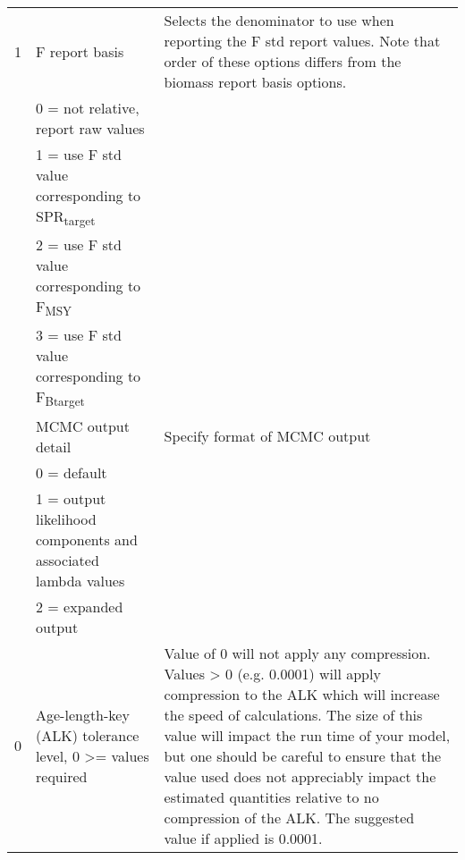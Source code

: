 \begin{landscape}
\begin{longtable}{p{1.5cm} p{7cm} p{12.5cm}}
 \hline
 1 & F report basis &  \multirow{1}{1cm}[-0.1cm]{\parbox{11cm}{Selects the denominator to use when reporting the F std report values.  Note that order of these options differs from the biomass report basis options.}}\\
   & 0 = not relative, report raw values & \\
   & 1 = use F std value corresponding to SPR\textsubscript{target} & \\
   & 2 = use F std value corresponding to F\textsubscript{MSY} & \\
   & 3 = use F std value corresponding to F\textsubscript{Btarget} & \\

  \pagebreak
  0 & MCMC output detail & \multirow{1}{1cm}[-0.1cm]{\parbox{11cm}{Specify format of MCMC output}} \\
  & 0 = default & \\
  & 1 = output likelihood components and associated lambda values &  \\
  & 2 = expanded output &  \\		 
  
  \hline
  \hypertarget{ALK}{0} & Age-length-key (ALK) tolerance level, 0 >= values required & Value of 0 will not apply any compression.  Values > 0 (e.g. 0.0001) will apply compression to the ALK which will increase the speed of calculations.  The size of this value will impact the run time of your model, but one should be careful to ensure that the value used does not appreciably impact the estimated quantities relative to no compression of the ALK.  The suggested value if applied is 0.0001. \\  
  
 

\end{longtable}
\end{landscape}
